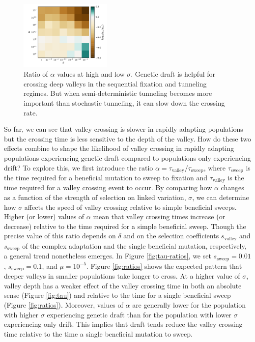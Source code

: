 \documentclass[rmp]{revtex4}
\begin{document}
\begin{spacing}{1.5}
\begin{figure}
\includegraphics[width=0.4\textwidth]{Figures/compare_ratios.pdf}
\caption{Ratio of $\alpha$ values at high and low $\sigma$. Genetic draft is helpful for crossing deep valleys in the sequential fixation and tunneling regimes. But when semi-deterministic tunneling becomes more important than stochastic tunneling, it can slow down the crossing rate.}
\label{fig:alpha_ratio}
\end{figure}

So far, we can see that valley crossing is slower in rapidly adapting populations but the crossing time is less sensitive to the depth of the valley. How do these two effects combine to shape the likelihood of valley crossing in rapidly adapting populations experiencing genetic draft compared to populations only experiencing drift? To explore this, we first introduce the ratio $\alpha = \tau_{\mathrm{valley}}/\tau_{\mathrm{sweep}}$, where $\tau_{\mathrm{sweep}}$ is the time required for a beneficial mutation to sweep to fixation and $\tau_{\mathrm{valley}}$ is the time required for a valley crossing event to occur.
By comparing how $\alpha$ changes as a function of the strength of selection on linked variation, $\sigma$, we can determine how $\sigma$ affects the speed of valley crossing relative to simple beneficial sweeps. Higher (or lower) values of $\alpha$ mean that valley crossing times increase (or decrease) relative to the time required for a simple beneficial sweep.
Though the precise value of this ratio depends on $\delta$ and on the selection coefficients $s_{\mathrm{valley}}$ and $s_{\mathrm{sweep}}$ of the complex adaptation and the single beneficial mutation, respectively, a general trend nonetheless emerges.
In Figure \ref{fig:tau-ratios}, we set $s_{\mathrm{sweep}} = 0.01$, $s_{\mathrm{sweep}} = 0.1$, and $\mu = 10^{-5}$.
Figure \ref{fig:ratios} shows the expected pattern that deeper valleys in smaller populations take longer to cross.
At a higher value of $\sigma$, valley depth has a weaker effect of the valley crossing time in both an absolute sense (Figure \ref{fig:tau}) and relative to the time for a single beneficial sweep (Figure \ref{fig:ratios}).
Moreover, values of $\alpha$ are generally lower for the population with higher $\sigma$ experiencing genetic draft than for the population with lower $\sigma$ experiencing only drift.
This implies that draft tends reduce the valley crossing time relative to the time a single beneficial mutation to sweep.


\end{spacing}
\end{document}
